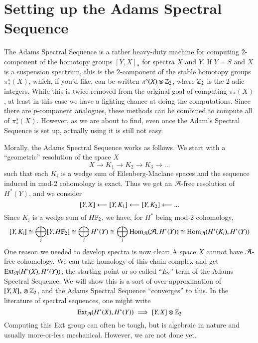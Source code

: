 \section{Setting up the Adams Spectral Sequence}

The Adams Spectral Sequence is a rather heavy-duty machine for computing $2$-component of the homotopy groups $[Y,X]_*$ for spectra $X$ and $Y$.  
If $Y=S$ and $X$ is a suspension spectrum, this is the 2-component of the stable homotopy groups $\pi^s_*(X)$, which, if you'd like, can be written $\pi^s(X)\otimes \mathbb{Z}_2$, where $\mathbb{Z}_2$ is the 2-adic integers.  
While this is twice removed from the original goal of computing $\pi_*(X)$, at least in this case we have a fighting chance at doing the computations.
Since there are $p$-component analogues, these methods can be combined to compute all of $\pi_*^s(X)$.  
However, as we are about to find, even once the Adam's Spectral Sequence is set up, actually using it is still not easy.  

Morally, the Adams Spectral Sequence works as follows.  
We start with a ``geometric'' resolution of the space $X$
\[X\to K_1\to K_2\to K_3\to ...\]
such that each $K_i$ is a wedge sum of Eilenberg-Maclane spaces and the sequence induced in mod-2 cohomology is exact.  
Thus we get an $\mathcal{A}$-free resolution of $H^*(Y)$, and we consider 
\[[Y,X]\longleftarrow [Y,K_1]\longleftarrow [Y,K_2]\longleftarrow ...\]
Since $K_i$ is a wedge sum of $H\mathbb{F}_2$, we have, for $H^*$ being mod-2 cohomology,
\[[Y,K_i]\cong \bigoplus_i [Y,H\mathbb{F}_2]\cong \bigoplus_i H^*(Y) \cong \bigoplus_i \operatorname{Hom}\nolimits_{\mathcal{A}}(\mathcal{A},H^*(Y))\cong \operatorname{Hom}\nolimits_{\mathcal{A}}(H^*(K_i),H^*(Y))\]
One reason we needed to develop spectra is now clear: A space $X$ cannot have $\mathcal{A}$-free cohomology.  
We can take homology of this chain complex and get $\operatorname{Ext}\nolimits _{\mathcal{A}}(H^*(X),H^*(Y))$, the starting point or so-called ``$E_2$'' term of the Adams Spectral Sequence.  
We will show this is a sort of over-approximation of $[Y,X]_*\otimes \mathbb{Z}_2$, and the Adams Spectral Sequence ``converges'' to this.  
In the literature of spectral sequences, one might write
\[\operatorname{Ext}\nolimits_{\mathcal{A}}(H^*(X),H^*(Y))\implies [Y,X]\otimes \mathbb{Z}_2\]
Computing this Ext group can often be tough, but is algebraic in nature and usually more-or-less mechanical.  
However, we are not done yet.  


